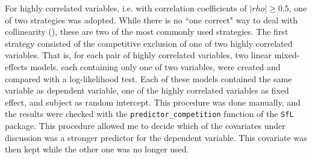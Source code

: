 For highly correlated variables, i.e. with correlation coefficients of $|rho|≥0.5$, one of two strategies was adopted. While there is no ``one correct" way to deal with collinearity (\cite{Tomaschek2018collin}), these are two of the most commonly used strategies. The first strategy consisted of the competitive exclusion of one of two highly correlated variables. That is, for each pair of highly correlated variables, two linear mixed-effects models, each containing only one of two variables, were created and compared with a log-likelihood test. Each of these models contained the same variable as dependent variable, one of the highly correlated variables as fixed effect, and subject as random intercept. This procedure was done manually, and the results were checked with the \texttt{predictor\_competition} function of the \texttt{SfL} package. This procedure allowed me to decide which of the covariates under discussion was a stronger predictor for the dependent variable. This covariate was then kept while the other one was no longer used. 

